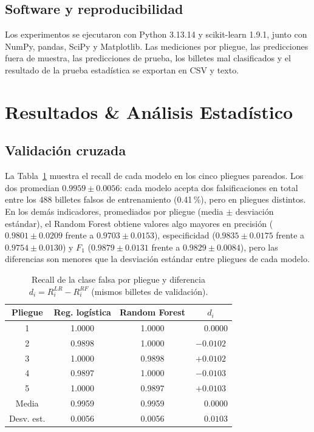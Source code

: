 \documentclass[conference]{IEEEtran}
\begin{document}
	\subsection{Software y reproducibilidad}
	
	Los experimentos se ejecutaron con Python 3.13.14 y scikit-learn 1.9.1, junto con NumPy, pandas, SciPy y Matplotlib. Las mediciones por pliegue, las predicciones fuera de muestra, las predicciones de prueba, los billetes mal clasificados y el resultado de la prueba estadística se exportan en CSV y texto.

    
	\section{Resultados \& Análisis Estadístico}
	\label{sec:resultados}
	
	\subsection{Validación cruzada}
	
	La Tabla~\ref{tab:recall-folds} muestra el recall de cada modelo en los cinco pliegues pareados. Los dos promedian $0.9959\pm0.0056$: cada modelo acepta dos falsificaciones en total entre los 488 billetes falsos de entrenamiento (0.41\,\%), pero en pliegues distintos. En los demás indicadores, promediados por pliegue (media $\pm$ desviación estándar), el Random Forest obtiene valores algo mayores en precisión ($0.9801\pm0.0209$ frente a $0.9703\pm0.0153$), especificidad ($0.9835\pm0.0175$ frente a $0.9754\pm0.0130$) y $F_1$ ($0.9879\pm0.0131$ frente a $0.9829\pm0.0084$), pero las diferencias son menores que la desviación estándar entre pliegues de cada modelo.
	
	\begin{table}[t]
		\centering
		\caption{Recall de la clase falsa por pliegue y diferencia $d_i=R^{LR}_i-R^{RF}_i$ (mismos billetes de validación).}
		\label{tab:recall-folds}
		\footnotesize
		\begin{tabular}{@{}cccc@{}}
			\toprule
			Pliegue & Reg. logística & Random Forest & $d_i$ \\
			\midrule
			1 & 1.0000 & 1.0000 & $\phantom{-}0.0000$ \\
			2 & 0.9898 & 1.0000 & $-0.0102$ \\
			3 & 1.0000 & 0.9898 & $+0.0102$ \\
			4 & 0.9897 & 1.0000 & $-0.0103$ \\
			5 & 1.0000 & 0.9897 & $+0.0103$ \\
			\midrule
			Media & 0.9959 & 0.9959 & $\phantom{-}0.0000$ \\
			Desv. est. & 0.0056 & 0.0056 & $\phantom{-}0.0103$ \\
			\bottomrule
		\end{tabular}
	\end{table}
	
\end{document}

